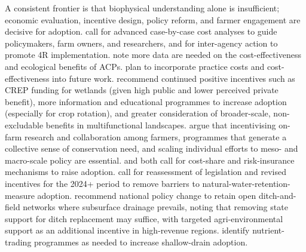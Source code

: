 A consistent frontier is that biophysical understanding alone is insufficient; economic evaluation, incentive design, policy reform, and farmer engagement are decisive for adoption. \textcite{Liu2021} call for advanced case-by-case cost analyses to guide policymakers, farm owners, and researchers, and for inter-agency action to promote 4R implementation. \textcite{Yuan2022} note more data are needed on the cost-effectiveness and ecological benefits of ACPs. \textcite{McLellan2015} plan to incorporate practice costs and cost-effectiveness into future work. \textcite{Christianson2014} recommend continued positive incentives such as CREP funding for wetlands (given high public and lower perceived private benefit), more information and educational programmes to increase adoption (especially for crop rotation), and greater consideration of broader-scale, non-excludable benefits in multifunctional landscapes. \textcite{David2015} argue that incentivising on-farm research and collaboration among farmers, programmes that generate a collective sense of conservation need, and scaling individual efforts to meso- and macro-scale policy are essential. \textcite{Jaynes2012} and \textcite{Karlen2005} both call for cost-share and risk-insurance mechanisms to raise adoption. \textcite{Kvítek2023} call for reassessment of legislation and revised incentives for the 2024+ period to remove barriers to natural-water-retention-measure adoption. \textcite{Marja2013} recommend national policy change to retain open ditch-and-field networks where subsurface drainage prevails, noting that removing state support for ditch replacement may suffice, with targeted agri-environmental support as an additional incentive in high-revenue regions. \textcite{Ghane2021b} identify nutrient-trading programmes as needed to increase shallow-drain adoption.

